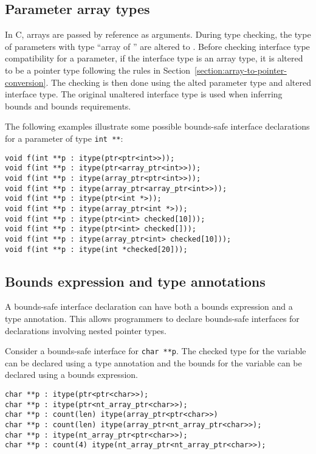 \subsection{Parameter array types}

In C, arrays are passed by reference as arguments.  During
type checking, the type of parameters with type ``array of '' are
altered to \uncheckedptrT.  Before checking interface type
compatibility for a parameter, if the interface type is an array type,
it is altered to be a pointer type following the rules in
Section~\ref{section:array-to-pointer-conversion}.   The checking is
then done using the alted parameter type and altered interface type.
The original unaltered interface type is used when inferring bounds
and bounds requirements.

The following examples illustrate some possible bounds-safe interface
declarations for a parameter of type \lstinline{int **}:
\begin{lstlisting}
void f(int **p : itype(ptr<ptr<int>>));
void f(int **p : itype(ptr<array_ptr<int>>));
void f(int **p : itype(array_ptr<ptr<int>>));
void f(int **p : itype(array_ptr<array_ptr<int>>));
void f(int **p : itype(ptr<int *>));
void f(int **p : itype(array_ptr<int *>));
void f(int **p : itype(ptr<int> checked[10]));
void f(int **p : itype(ptr<int> checked[]));
void f(int **p : itype(array_ptr<int> checked[10]));
void f(int **p : itype(int *checked[20]));
\end{lstlisting}

\subsection{Bounds expression and type annotations}
A bounds-safe interface declaration can have both a bounds expression and a type
annotation.  This allows programmers to declare bounds-safe interfaces for declarations involving
nested pointer types.

Consider a bounds-safe interface for \lstinline{char **p}.
The checked type for the variable can be declared using a type annotation
and the bounds for the variable can be declared using a bounds expression.
\begin{lstlisting}
char **p : itype(ptr<ptr<char>>);
char **p : itype(ptr<nt_array_ptr<char>>);
char **p : count(len) itype(array_ptr<ptr<char>>)
char **p : count(len) itype(array_ptr<nt_array_ptr<char>>);
char **p : itype(nt_array_ptr<ptr<char>>);
char **p : count(4) itype(nt_array_ptr<nt_array_ptr<char>>);
\end{lstlisting}

